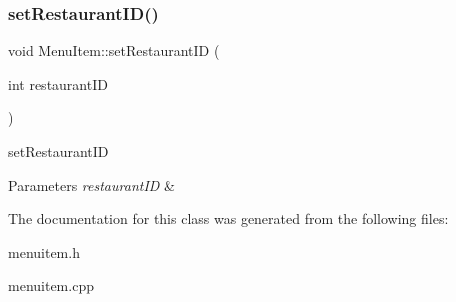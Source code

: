 \subsubsection{\texorpdfstring{set\+Restaurant\+I\+D()}{setRestaurantID()}}
{\footnotesize\ttfamily void Menu\+Item\+::set\+Restaurant\+ID (\begin{DoxyParamCaption}\item[{int}]{restaurant\+ID }\end{DoxyParamCaption})}



set\+Restaurant\+ID 


\begin{DoxyParams}{Parameters}
{\em restaurant\+ID} & \\
\hline
\end{DoxyParams}


The documentation for this class was generated from the following files\+:\begin{DoxyCompactItemize}
\item 
menuitem.\+h\item 
menuitem.\+cpp\end{DoxyCompactItemize}
